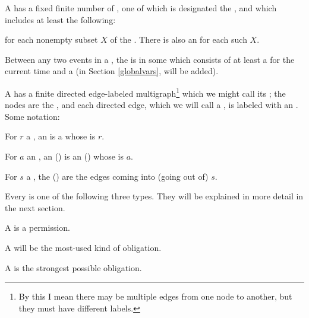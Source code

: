 \documentclass[12pt]{article}
\begin{document}
A \Contract has a fixed finite number of , one of which is designated the , and which includes at least the following:
\begin{LPPI}
\item {}
\item {} for each nonempty subset $X$ of the \Roles. There is also an \Action {} for each such $X$.
\end{LPPI}
Between any two events in a \trace, the \Contract is in some  which consists of at least a \TimeStamp for the current time and a \State (in Section \ref{globalvars}, \GVars will be added).

A \Contract has a finite directed edge-labeled multigraph\footnote{By this I mean there may be multiple edges from one node to another, but they must have different labels.} which we might call its ; the nodes are the \States, and each directed edge, which we will call a , is labeled with an \Action. Some notation:
\begin{LPPI}
\item For $r$ a \Role, an  is a \transition whose \Role is $r$.
\item For $a$ an \Action, an  () is an \Event (\transition) whose \Action is $a$.
\item For $s$ a \State, the  () are the edges coming into (going out of) $s$.
\end{LPPI}
Every \transition is one of the following three types. They will be explained in more detail in the next section.
\begin{LPPI}
\item A  is a permission.
\item A  will be the most-used kind of obligation. 
\item A  is the strongest possible obligation. 
\end{LPPI}
\end{document}
